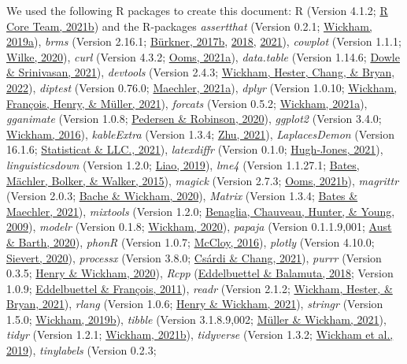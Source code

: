 \documentclass[
  11pt,
  english,
  man,floatsintext]{apa6}
\begin{document}
We used the following R packages to create this document: R (Version 4.1.2; \protect\hyperlink{ref-R-base}{R Core Team, 2021b}) and the R-packages \emph{assertthat} (Version 0.2.1; \protect\hyperlink{ref-R-assertthat}{Wickham, 2019a}), \emph{brms} (Version 2.16.1; \protect\hyperlink{ref-R-brms_a}{Bürkner, 2017b}, \protect\hyperlink{ref-R-brms_b}{2018}, \protect\hyperlink{ref-R-brms_c}{2021}), \emph{cowplot} (Version 1.1.1; \protect\hyperlink{ref-R-cowplot}{Wilke, 2020}), \emph{curl} (Version 4.3.2; \protect\hyperlink{ref-R-curl}{Ooms, 2021a}), \emph{data.table} (Version 1.14.6; \protect\hyperlink{ref-R-data.table}{Dowle \& Srinivasan, 2021}), \emph{devtools} (Version 2.4.3; \protect\hyperlink{ref-R-devtools}{Wickham, Hester, Chang, \& Bryan, 2022}), \emph{diptest} (Version 0.76.0; \protect\hyperlink{ref-R-diptest}{Maechler, 2021a}), \emph{dplyr} (Version 1.0.10; \protect\hyperlink{ref-R-dplyr}{Wickham, François, Henry, \& Müller, 2021}), \emph{forcats} (Version 0.5.2; \protect\hyperlink{ref-R-forcats}{Wickham, 2021a}), \emph{gganimate} (Version 1.0.8; \protect\hyperlink{ref-R-gganimate}{Pedersen \& Robinson, 2020}), \emph{ggplot2} (Version 3.4.0; \protect\hyperlink{ref-R-ggplot2}{Wickham, 2016}), \emph{kableExtra} (Version 1.3.4; \protect\hyperlink{ref-R-kableExtra}{Zhu, 2021}), \emph{LaplacesDemon} (Version 16.1.6; \protect\hyperlink{ref-R-LaplacesDemon}{Statisticat \& LLC., 2021}), \emph{latexdiffr} (Version 0.1.0; \protect\hyperlink{ref-R-latexdiffr}{Hugh-Jones, 2021}), \emph{linguisticsdown} (Version 1.2.0; \protect\hyperlink{ref-R-linguisticsdown}{Liao, 2019}), \emph{lme4} (Version 1.1.27.1; \protect\hyperlink{ref-R-lme4}{Bates, Mächler, Bolker, \& Walker, 2015}), \emph{magick} (Version 2.7.3; \protect\hyperlink{ref-R-magick}{Ooms, 2021b}), \emph{magrittr} (Version 2.0.3; \protect\hyperlink{ref-R-magrittr}{Bache \& Wickham, 2020}), \emph{Matrix} (Version 1.3.4; \protect\hyperlink{ref-R-Matrix}{Bates \& Maechler, 2021}), \emph{mixtools} (Version 1.2.0; \protect\hyperlink{ref-R-mixtools}{Benaglia, Chauveau, Hunter, \& Young, 2009}), \emph{modelr} (Version 0.1.8; \protect\hyperlink{ref-R-modelr}{Wickham, 2020}), \emph{papaja} (Version 0.1.1.9,001; \protect\hyperlink{ref-R-papaja}{Aust \& Barth, 2020}), \emph{phonR} (Version 1.0.7; \protect\hyperlink{ref-R-phonR}{McCloy, 2016}), \emph{plotly} (Version 4.10.0; \protect\hyperlink{ref-R-plotly}{Sievert, 2020}), \emph{processx} (Version 3.8.0; \protect\hyperlink{ref-R-processx}{Csárdi \& Chang, 2021}), \emph{purrr} (Version 0.3.5; \protect\hyperlink{ref-R-purrr}{Henry \& Wickham, 2020}), \emph{Rcpp} (\protect\hyperlink{ref-R-Rcpp_b}{Eddelbuettel \& Balamuta, 2018}; Version 1.0.9; \protect\hyperlink{ref-R-Rcpp_a}{Eddelbuettel \& François, 2011}), \emph{readr} (Version 2.1.2; \protect\hyperlink{ref-R-readr}{Wickham, Hester, \& Bryan, 2021}), \emph{rlang} (Version 1.0.6; \protect\hyperlink{ref-R-rlang}{Henry \& Wickham, 2021}), \emph{stringr} (Version 1.5.0; \protect\hyperlink{ref-R-stringr}{Wickham, 2019b}), \emph{tibble} (Version 3.1.8.9,002; \protect\hyperlink{ref-R-tibble}{Müller \& Wickham, 2021}), \emph{tidyr} (Version 1.2.1; \protect\hyperlink{ref-R-tidyr}{Wickham, 2021b}), \emph{tidyverse} (Version 1.3.2; \protect\hyperlink{ref-R-tidyverse}{Wickham et al., 2019}), \emph{tinylabels} (Version 0.2.3; 
\end{document}
